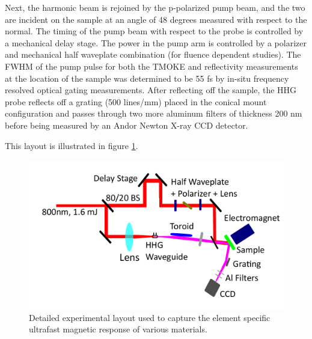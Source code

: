 Next, the harmonic beam is rejoined by the p-polarized pump beam, and the two are incident on the sample at an angle of 48 degrees measured with respect to the normal. The timing of the pump beam with respect to the probe is controlled by a mechanical delay stage. The power in the pump arm is controlled by a polarizer and mechanical half waveplate combination (for fluence dependent studies). The FWHM of the pump pulse for both the TMOKE and reflectivity measurements at the location of the sample was determined to be 55 fs by in-situ frequency resolved optical gating measurements. After reflecting off the sample, the HHG probe reflects off a grating (500 lines/mm) placed in the conical mount configuration and passes through two more aluminum filters of thickness 200 nm before being measured by an Andor Newton X-ray CCD detector.

This layout is illustrated in figure \ref{fig:TMOKEExpSchematic}.

\begin{figure}
	\begin{center}
		\includegraphics[width=150mm]{figs/TMOKEExpSchematic.pdf}
	\end{center}
	\caption{Detailed experimental layout used to capture the element specific ultrafast magnetic response of various materials.}
	\label{fig:TMOKEExpSchematic}
\end{figure}
